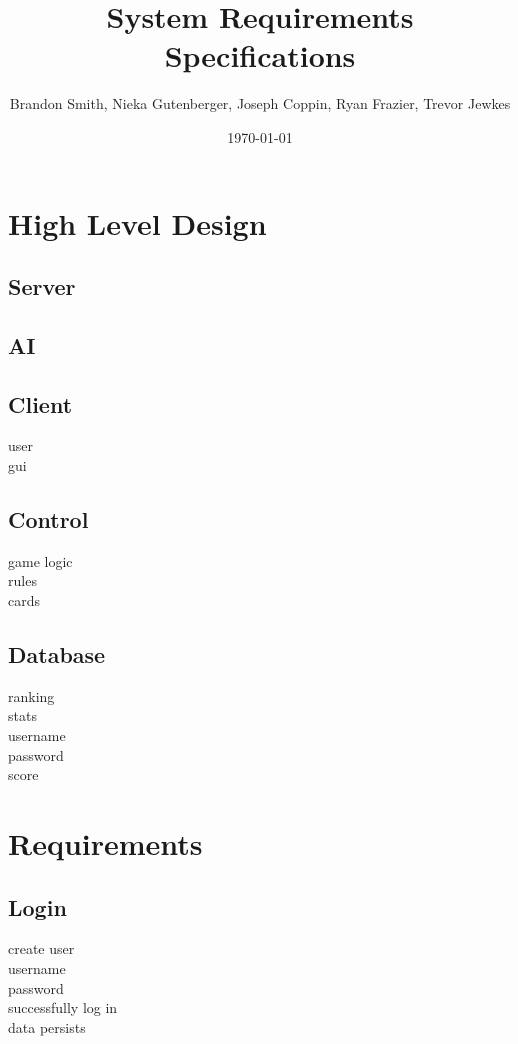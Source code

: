 \documentclass[11pt, titlepage]{article}
\author{Brandon Smith, Nieka Gutenberger, Joseph Coppin, Ryan Frazier, Trevor Jewkes}
\title{System Requirements Specifications}
\date{\today}
\begin{document}
	\maketitle
	\setcounter{tocdepth}{1}
	\section{High Level Design}
	
		\subsection{Server}
		
		\subsection{AI}
			
		\subsection{Client}
			user\\
			gui
			
		\subsection{Control}
			game logic \\
			rules\\
			cards\\
		\subsection{Database}
			ranking\\
			stats\\
			username\\
			password\\
			score\\
	\section{Requirements}
	
		\subsection{Login}
			create user\\
			username\\
			password\\
			successfully log in\\
			data persists\\
\end{document}
